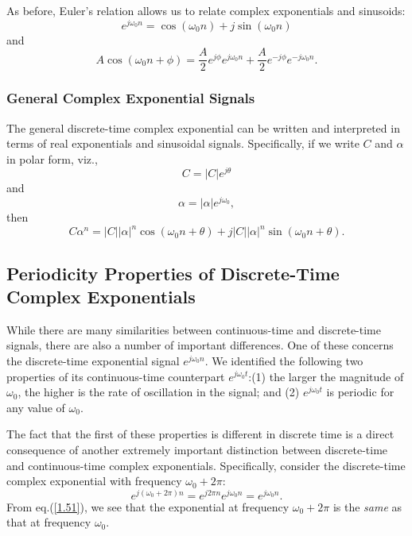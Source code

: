 \documentclass[a4paper,10pt,twoside]{book}
\begin{document}
As before, Euler's relation allows us to relate complex exponentials and sinusoids:
\begin{equation}
    e^{j\omega_0n}=\cos(\omega_0n)+j\sin(\omega_0n)
    \label{1.48}
\end{equation}
and
\begin{equation}
    A\cos(\omega_{0}n+\phi) = \frac{A}{2}e^{j\phi}e^{j\omega_{0}n} + \frac{A}{2}e^{-j\phi}e^{-j\omega_{0}n}.
    \label{1.49}
\end{equation}

\subsubsection{General Complex Exponential Signals}

The general discrete-time complex exponential can be written and interpreted in terms of real exponentials and sinusoidal signals. Specifically, if we write $C$ and $\alpha$ in polar form, viz., $$C=|C|e^{j\theta}$$ and $$\alpha=|\alpha|e^{j\omega_0},$$ then
\begin{equation}
    C\alpha^{n}=|C||\alpha|^{n}\cos(\omega_{0}n+\theta)+j|C||\alpha|^{n}\sin(\omega_{0}n+\theta).
    \label{1.50}
\end{equation}

\subsection{Periodicity Properties of Discrete-Time Complex Exponentials}
\label{section:1.3.3}

While there are many similarities between continuous-time and discrete-time signals, there are also a number of important differences. One of these concerns the discrete-time exponential signal $e^{j\omega_0n}$. We identified the following two properties of its continuous-time counterpart $e^{j\omega_0t}$:(1) the larger the magnitude of $\omega_0$, the higher is the rate of oscillation in the signal; and (2) $e^{j\omega_0t}$ is periodic for any value of $\omega_0$.

The fact that the first of these properties is different in discrete time is a direct consequence of another extremely important distinction between discrete-time and continuous-time complex exponentials. Specifically, consider the discrete-time complex exponential with frequency $\omega_0+2\pi$:
\begin{equation}
    e^{j(\omega_0+2\pi)n} = e^{j2\pi n}e^{j\omega_0n} = e^{j\omega_0n}.
    \label{1.51}
\end{equation}
From eq.\;(\ref{1.51}), we see that the exponential at frequency $\omega_0+2\pi$ is the \textit{same} as that at frequency $\omega_0$.
\end{document}

